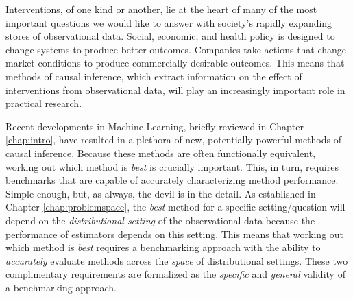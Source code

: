\documentclass[../main.tex]{subfiles}
\begin{document}

Interventions, of one kind or another, lie at the heart of many of the most important questions we would like to answer with society's rapidly expanding stores of observational data. Social, economic, and health policy is designed to change systems to produce better outcomes. Companies take actions that change market conditions to produce commercially-desirable outcomes. This means that methods of causal inference, which extract information on the effect of interventions from observational data, will play an increasingly important role in practical research.

\vspace{\baselineskip}

Recent developments in Machine Learning, briefly reviewed in Chapter \ref{chap:intro}, have resulted in a plethora of new, potentially-powerful methods of causal inference. Because these methods are often functionally equivalent, working out which method is \textit{best} is crucially important. This, in turn, requires benchmarks that are capable of accurately characterizing method performance. Simple enough, but, as always, the devil is in the detail. As established in Chapter \ref{chap:problemspace}, the \textit{best} method for a specific setting/question will depend on the \textit{distributional setting} of the observational data because the performance of estimators depends on this setting. This means that working out which method is \textit{best} requires a benchmarking approach with the ability to \textit{accurately} evaluate methods across the \textit{space} of distributional settings. These two complimentary requirements are formalized as the \textit{specific} and \textit{general} validity of a benchmarking approach.

\vspace{\baselineskip}
\end{document}
